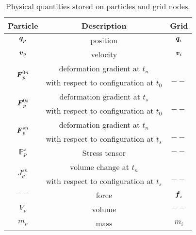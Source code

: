 \begin{table}[h!]
\caption{Physical quantities stored on particles and grid nodes.}
\vspace{-3mm}
\begin{tabular}{ccc}
\hline
\textbf{Particle} & \textbf{Description} & \textbf{Grid}\\
\hline
$\boldsymbol{q}_p$ & position & $\boldsymbol{q}_i$ \\
$\boldsymbol{v}_p$ & velocity & $\boldsymbol{v}_i$ \\
\multirow{2}{*}{$\boldsymbol{F}_p^{0n}$} & deformation gradient at $t_n$ \\
                                & with respect to configuration at $t_0$&{$--$}\\
\multirow{2}{*}{$\boldsymbol{F}_p^{0s}$} & deformation gradient at $t_s$ \\
                                & with respect to configuration at $t_0$&$--$\\
\multirow{2}{*}{$\boldsymbol{F}_p^{sn}$} & deformation gradient at $t_n$ \\
                                & with respect to configuration at $t_s$&$--$\\
$\mathbb{P}_p^{s}$ &Stress tensor &$--$\\
\multirow{2}{*}{$J_p^{sn}$}& volume change at $t_n$  \\
                           & with respect to configuration at $t_s$&$--$\\
$--$ & force & $\boldsymbol{f}_i$  \\
$V_p$ & volume & $--$ \\
$m_p$ &  mass & $m_i$ \\
\hline
\end{tabular}
\label{tab:notation}
\vspace{-7mm}
\end{table}